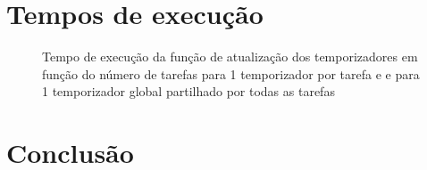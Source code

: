 \documentclass[journal]{IEEEtran}
\begin{document}
\section{Tempos de execução}

\begin{figure}
	\centering
	\resizebox{0.5\textwidth}{!}{\large }
	\caption{Tempo de execução da função de atualização dos temporizadores em função do número de tarefas para 1 temporizador por tarefa e e para 1 temporizador global partilhado por todas as tarefas}
	\label{fig:timers}
\end{figure}

\section{Conclusão}
\end{document}
